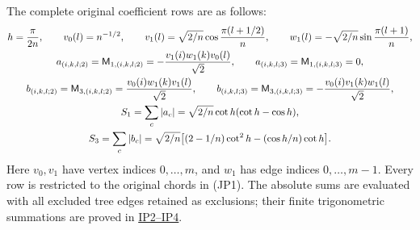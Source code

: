 \documentclass[11pt]{article}
\begin{document}
The complete original coefficient rows are as follows:
\[
\begin{gathered}
 h={\pi\over2n},\qquad v_0(l)=n^{-1/2},\qquad
 v_1(l)=\sqrt{2/n}\cos{\pi(l+1/2)\over n},\qquad
 w_1(l)=-\sqrt{2/n}\sin{\pi(l+1)\over n},\\
 a_{(i,k,l;2)}=\mathsf M_{1,(i,k,l;2)}
             =-{v_1(i)w_1(k)v_0(l)\over\sqrt2},\qquad
 a_{(i,k,l;3)}=\mathsf M_{1,(i,k,l;3)}=0,\\
 b_{(i,k,l;2)}=\mathsf M_{3,(i,k,l;2)}
             ={v_0(i)w_1(k)v_1(l)\over\sqrt2},\qquad
 b_{(i,k,l;3)}=\mathsf M_{3,(i,k,l;3)}
             =-{v_0(i)v_1(k)w_1(l)\over\sqrt2},\\
 S_1=\sum_c|a_c|
       =\sqrt{2/n}\cot h(\cot h-\cos h),\\
 S_3=\sum_c|b_c|
       =\sqrt{2/n}\big[(2-1/n)\cot^2h-(\cos h/n)\cot h\big].
\end{gathered}
\]
Here \(v_0,v_1\) have vertex indices \(0,\ldots,m\), and \(w_1\)
has edge indices \(0,\ldots,m-1\). Every row is restricted to the
original chords in (JP1). The absolute sums are evaluated with all
excluded tree edges retained as exclusions; their finite trigonometric
summations are proved in
\href{https://github.com/KokunoYumeto/yang-mills-interacting-workbench/blob/256d0fb1988e810df3fcb796c54077c564d48672/yang-mills/continuations/20261011-central-signs-shrinking-window/PHASE_MOMENTS_AND_ORIGINAL_PATH.md#L108}{IP2–IP4}.
\end{document}
